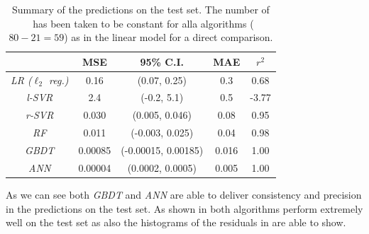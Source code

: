\begin{table}[htbp]
  \centering
  \begin{tabular}{@{}ccccc@{}}
  \toprule
                            & \textbf{MSE} & \textbf{95\% C.I.}  & \textbf{MAE} & $r^2$ \\
  \midrule
  \emph{LR ($\ell_2$ reg.)} & 0.16         & (0.07, 0.25)        & 0.3          & 0.68        \\
  \emph{l-SVR}              & 2.4          & (-0.2, 5.1)         & 0.5          & -3.77       \\
  \emph{r-SVR}              & 0.030        & (0.005, 0.046)      & 0.08         & 0.95        \\
  \emph{RF}                 & 0.011        & (-0.003, 0.025)     & 0.04         & 0.98        \\
  \emph{GBDT}               & 0.00085      & (-0.00015, 0.00185) & 0.016        & 1.00        \\
  \emph{ANN}                & 0.00004      & (0.0002, 0.0005)    & 0.005        & 1.00        \\
  \bottomrule
  \end{tabular}%
  \caption{%
    Summary of the predictions on the test set.
    The number of \dof\ has been taken to be constant for alla algorithms ($80 - 21 = 59$) as in the linear model for a direct comparison.
  }
  \label{tab:lumps:preds}
\end{table}

As we can see both \emph{GBDT} and \emph{ANN} are able to deliver consistency and precision in the predictions on the test set.
As shown in  both algorithms perform extremely well on the test set as also the histograms of the residuals in  are able to show.

